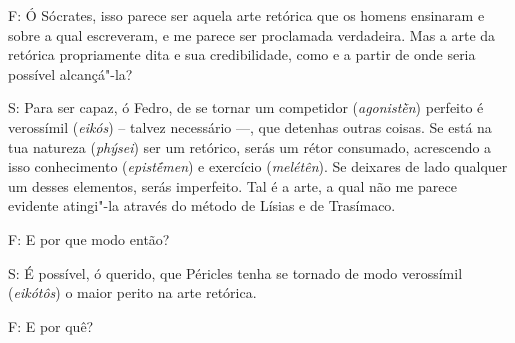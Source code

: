 F: Ó Sócrates, isso parece ser aquela arte retórica que os homens
ensinaram e sobre a qual escreveram, e me parece ser proclamada
verdadeira. Mas a arte da retórica propriamente dita e sua
credibilidade, \bekker{[269d]} como e a partir de onde seria possível
alcançá"-la?

 

S: Para ser capaz, ó Fedro, de se tornar um competidor
(\emph{agonistḕn}) perfeito é verossímil (\emph{eikós}) -- talvez
necessário \mbox{---,} que detenhas outras coisas. Se está na tua natureza
(\emph{phýsei}) ser um retórico, serás um rétor consumado, acrescendo a
isso conhecimento (\emph{epistḗmen}) e exercício (\emph{melétên}). Se
deixares de lado qualquer um desses elementos, serás
imperfeito. Tal é a arte, a qual não me parece evidente
atingi"-la através do método de Lísias e de Trasímaco.

F: E por que modo então?

 

S: É possível, ó querido, que Péricles tenha se tornado de modo
verossímil (\emph{eikótôs}) o maior perito na arte retórica.

F: E por quê?

 

